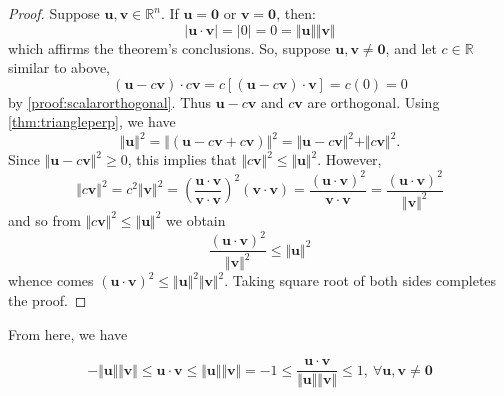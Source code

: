 \documentclass{article}
\begin{document}
\begin{proof}\label{proof:cauchyschwarz}
    Suppose $\bm{u}, \bm{v} \in \mathbb{R}^n$. If $\bm{u} = \bm{0}$ or $\bm{v} = \bm{0}$, then: 
    \begin{equation*}
        |\bm{u} \cdot \bm{v}| = |0| = 0 = \Vert \bm{u} \Vert \Vert \bm{v}\Vert 
    \end{equation*}
    \noindent which affirms the theorem's conclusions. So, suppose $\bm{u}, \bm{v} \neq \bm{0}$, and let $c \in \mathbb{R}$ similar to above, 
    \begin{equation*}
        (\bm{u} - c\bm{v}) \cdot c\bm{v} = c[(\bm{u} - c\bm{v}) \cdot \bm{v}] = c(0) = 0
    \end{equation*}
    \noindent by \ref{proof:scalarorthogonal}. Thus $\bm{u} - c\bm{v}$ and $c\bm{v}$ are orthogonal. Using \ref{thm:triangleperp}, we have 
    \begin{equation*}
        \Vert \bm{u} \Vert^{2} = \Vert (\bm{u}-c\bm{v}+c\bm{v})\Vert^{2} = \Vert \bm{u} - c\bm{v} \Vert^{2} + \Vert c\bm{v}\Vert^{2}. 
    \end{equation*}
    \noindent Since $\Vert \bm{u} - c\bm{v} \Vert^{2} \geq 0$, this implies that $\Vert c\bm{v}\Vert^{2} \leq \Vert \bm{u} \Vert^{2}$. However, 
    \begin{equation*}
        \Vert c\bm{v} \Vert^{2} = c^2\Vert \bm{v} \Vert^{2} = \left(\frac{\bm{u} \cdot \bm{v}}{\bm{v} \cdot \bm{v}}\right)^{2} (\bm{v} \cdot \bm{v}) = \frac{(\bm{u} \cdot \bm{v})^{2}}{\bm{v} \cdot \bm{v}} = \frac{(\bm{u} \cdot \bm{v})^{2}}{\Vert \bm{v} \Vert^{2}}
    \end{equation*}
    \noindent and so from $\Vert c\bm{v} \Vert^{2} \leq \Vert \bm{u}\Vert^{2}$ we obtain 
    \begin{equation*}
        \frac{(\bm{u} \cdot \bm{v})^{2}}{\Vert \bm{v} \Vert^{2}} \leq \Vert \bm{u} \Vert^{2}
    \end{equation*}
    \noindent whence comes $(\bm{u} \cdot \bm{v})^{2} \leq \Vert \bm{u} \Vert^{2} \Vert \bm{v} \Vert^{2}$.
    \noindent Taking square root of both sides completes the proof.
\end{proof}

\noindent From here, we have 

\begin{equation*}
    -\Vert\bm{u}\Vert\Vert\bm{v}\Vert\leq \bm{u} \cdot \bm{v} \leq \Vert\bm{u}\Vert\Vert\bm{v}\Vert = -1 \leq \frac{\bm{u} \cdot \bm{v}}{\Vert\bm{u}\Vert\Vert\bm{v}\Vert} \leq 1, \ \forall \bm{u}, \bm{v} \neq \bm{0}
\end{equation*}
\end{document}

